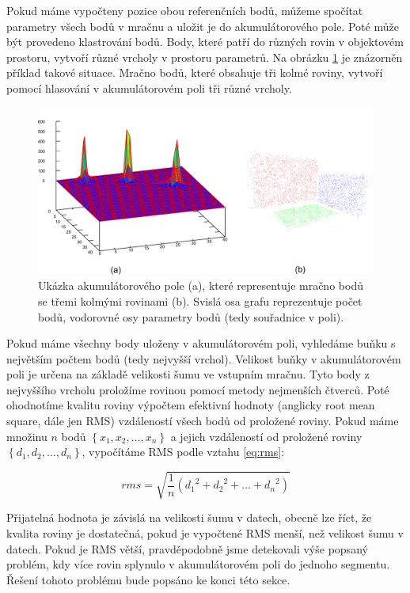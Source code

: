 \documentclass[11pt,twoside,a4paper]{book}
\begin{document}
Pokud máme vypočteny pozice obou referenčních bodů, můžeme spočítat parametry všech bodů v mračnu a uložit je do akumulátorového pole. Poté může být provedeno klastrování bodů. Body, které patří do různých rovin v objektovém prostoru, vytvoří různé vrcholy v prostoru parametrů. Na obrázku \ref{fig:acc-pole} je znázorněn příklad takové situace. Mračno bodů, které obsahuje tři kolmé roviny, vytvoří pomocí hlasování v akumulátorovém poli tři různé vrcholy.

\begin{figure}[ht]
\begin{center}
\includegraphics[width=\textwidth]{figures/ac-pole}
\caption{Ukázka akumulátorového pole (a), které representuje mračno bodů se třemi kolmými rovinami (b). Svislá osa grafu reprezentuje počet bodů, vodorovné osy parametry bodů (tedy souřadnice v poli).}
\label{fig:acc-pole}
\end{center}
\end{figure}

Pokud máme všechny body uloženy v akumulátorovém poli, vyhledáme buňku s největším počtem bodů (tedy nejvyšší vrchol). Velikost buňky v akumulátorovém poli je určena na základě velikosti šumu ve vstupním mračnu. Tyto body z nejvyššího vrcholu proložíme rovinou pomocí metody nejmenších čtverců. Poté ohodnotíme kvalitu roviny výpočtem efektivní hodnoty (anglicky root mean square, dále jen RMS) vzdáleností všech bodů od proložené roviny. Pokud máme množinu $n$ bodů $\left\{x_1, x_2, \ldots , x_n\right\}$ a jejich vzdáleností od proložené roviny $\left\{d_1, d_2, \ldots , d_n\right\}$, vypočítáme RMS podle vztahu \ref{eq:rms}:

\begin{equation} 
\label{eq:rms}
rms = \sqrt{
\frac{1}{n}\left({d_1}^2 + {d_2}^2 + \ldots + {d_n}^2\right)
}
\end{equation}

Přijatelná hodnota je závislá na velikosti šumu v datech, obecně lze říct, že kvalita roviny je dostatečná, pokud je vypočtené RMS menší, než velikost šumu v datech. Pokud je RMS větší, pravděpodobně jsme detekovali výše popsaný problém, kdy více rovin splynulo v akumulátorovém poli do jednoho segmentu. Řešení tohoto problému bude popsáno ke konci této sekce.
\end{document}
